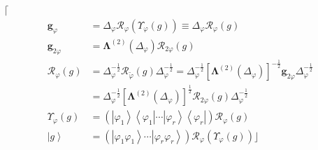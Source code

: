 \documentclass[aps,preprint]{revtex4}%
\begin{document}
$\lceil$%
\begin{align}
\mathbf{g}_{\varphi}  &  =\Delta_{\varphi}\mathcal{R}_{\varphi}\left(
\Upsilon_{\varphi}\left(  g\right)  \right)  \equiv\Delta_{\varphi}%
\mathcal{R}_{\varphi}\left(  g\right) \nonumber\\
\mathbf{g}_{2\varphi}  &  =\mathbf{\Lambda}^{\left(  2\right)  }\left(
\Delta_{\varphi}\right)  \mathcal{R}_{2\varphi}\left(  g\right) \nonumber\\
\mathcal{R}_{\varphi}\left(  g\right)   &  =\Delta_{\varphi}^{-\frac{1}{2}%
}\mathcal{R}_{\tilde{\varphi}}\left(  g\right)  \Delta_{\varphi}^{-\frac{1}%
{2}}=\Delta_{\varphi}^{-\frac{1}{2}}\left[  \mathbf{\Lambda}^{\left(
2\right)  }\left(  \Delta_{\varphi}\right)  \right]  ^{-\frac{1}{2}}%
\mathbf{g}_{2\varphi}\Delta_{\varphi}^{-\frac{1}{2}}\\
&  =\Delta_{\varphi}^{-\frac{1}{2}}\left[  \mathbf{\Lambda}^{\left(  2\right)
}\left(  \Delta_{\varphi}\right)  \right]  ^{\frac{1}{2}}\mathcal{R}%
_{2\varphi}\left(  g\right)  \Delta_{\varphi}^{-\frac{1}{2}}\\
\Upsilon_{\varphi}\left(  g\right)   &  =\left(  \left\vert \varphi
_{1}\right\rangle \left\langle \varphi_{1}\right\vert \cdots\left\vert
\varphi_{r}\right\rangle \left\langle \varphi_{r}\right\vert \right)
\mathcal{R}_{\varphi}\left(  g\right) \nonumber\\
\left\vert g\right\rangle  &  =\left(  \left\vert \varphi_{1}\varphi
_{1}\right\rangle \cdots\left\vert \varphi_{r}\varphi_{r}\right\rangle
\right)  \mathcal{R}_{\varphi}\left(  \Upsilon_{\varphi}\left(  g\right)
\right)  \rfloor
\end{align}
\end{document}
